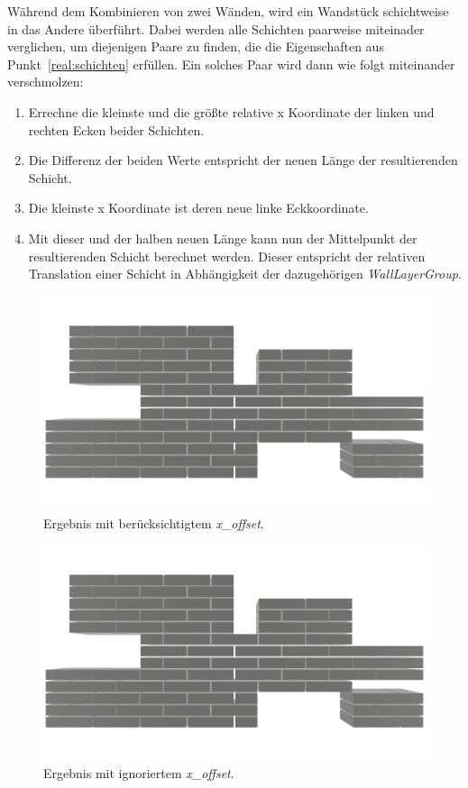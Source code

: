Während dem Kombinieren von zwei Wänden, wird ein Wandstück schichtweise in das Andere überführt.
Dabei werden alle Schichten paarweise miteinader verglichen, um diejenigen Paare zu finden, die die Eigenschaften aus Punkt~\ref{real:schichten} erfüllen.
Ein solches Paar wird dann wie folgt miteinander verschmolzen:
\begin{enumerate}
  \item Errechne die kleinste und die größte relative x Koordinate der linken und rechten Ecken beider Schichten.
  \item Die Differenz der beiden Werte entspricht der neuen Länge der resultierenden Schicht.
  \item Die kleinste x Koordinate ist deren neue linke Eckkoordinate.
  \item Mit dieser und der halben neuen Länge kann nun der Mittelpunkt der resultierenden Schicht berechnet werden. Dieser entspricht der relativen Translation einer Schicht in Abhängigkeit der dazugehörigen \textit{WallLayerGroup}.
\end{enumerate}

\begin{figure}[htb]
  \centering
  \includegraphics[width=0.8\columnwidth]{fig/Real_Combination_Output.png}
  \caption{Ergebnis mit berücksichtigtem \textit{x\_offset}.}
  \label{fig:real:combination_example_solution_xoffset}
\end{figure}

\begin{figure}[hbt]
  \centering
  \includegraphics[width=0.8\columnwidth]{fig/Real_Combination_Output_No_XOffsetpng.png}
  \caption{Ergebnis mit ignoriertem \textit{x\_offset}.}
  \label{fig:real:combination_example_solution_no_xoffset}
\end{figure}

